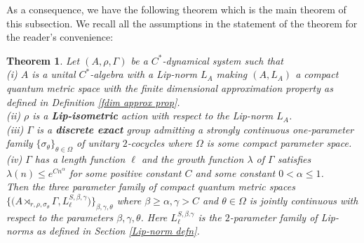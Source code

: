 \documentclass[a4paper,11pt,reqno]{amsart}
\theoremstyle{plain}
\newtheorem{thm}{Theorem}[section]
\theoremstyle{mainthmstyle}
\theoremstyle{named}
\numberwithin{equation}{section}
\begin{document}
As a consequence, we have the following theorem which is the main theorem of this subsection. We recall all the assumptions in the statement of the theorem for the reader's convenience:
\begin{thm}
    \label{mainthm} Let $(A,\rho,\Gamma)$ be a $C^{\ast}$-dynamical system such that\\
    (i) $A$ is a unital $C^{\ast}$-algebra with a Lip-norm $L_A$ making $(A,L_A)$ a compact quantum metric space with the finite dimensional approximation property as defined in Definition \ref{fdim approx prop}.\\
    (ii) $\rho$ is a {\bf Lip-isometric} action with respect to the Lip-norm $L_A$.\\
    (iii) $\Gamma$ is a {\bf discrete exact} group admitting a strongly continuous one-parameter family $\{\sigma_{\theta}\}_{\theta\in\Omega}$ of unitary $2$-cocycles where $\Omega$ is some compact parameter space.\\
    (iv) $\Gamma$ has a length function $\ell$ and the growth function $\lambda$ of $\Gamma$ satisfies $\lambda(n)\leq e^{Cn^{\alpha}}$ for some positive constant $C$ and some constant $0<\alpha\leq 1$.\\
    Then the three parameter family of compact quantum metric spaces $\{\big(A\rtimes_{r,\rho,\sigma_{\theta}}\Gamma,L^{S,\beta,\gamma}_{\ell}\big)\}_{\beta,\gamma,\theta}$ where $\beta\geq\alpha,\gamma>C$ and $\theta\in\Omega$ is jointly continuous with respect to the parameters $\beta,\gamma,\theta$. Here $L^{S,\beta.\gamma}_{\ell}$ is the $2$-parameter family of Lip-norms as defined in Section \ref{Lip-norm defn}.
\end{thm}
\end{document}
